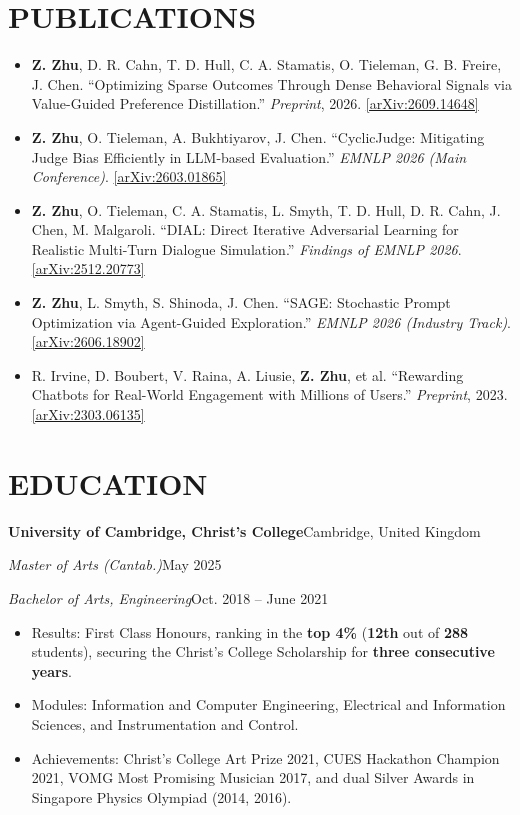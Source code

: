 \documentclass[10pt,a4paper]{article}
\newcommand{\headerinfo}[2]{%
    \textit{#1}\hfill #2\par\vspace{-0.5\baselineskip}%
}
\newcommand{\experience}[4]{%
    \textbf{#1}\hfill #2\par\vspace{-0.5\baselineskip}%
    \textit{#3}\hfill #4\par\vspace{-0.5\baselineskip}%
}
\begin{document}
\section{PUBLICATIONS}
\begin{itemize}
    \item \textbf{Z. Zhu}, D. R. Cahn, T. D. Hull, C. A. Stamatis, O. Tieleman, G. B. Freire, J. Chen. ``Optimizing Sparse Outcomes Through Dense Behavioral Signals via Value-Guided Preference Distillation.'' \textit{Preprint}, 2026. \href{https://arxiv.org/abs/2609.14648}{[arXiv:2609.14648]}
    \item \textbf{Z. Zhu}, O. Tieleman, A. Bukhtiyarov, J. Chen. ``CyclicJudge: Mitigating Judge Bias Efficiently in LLM-based Evaluation.'' \textit{EMNLP 2026 (Main Conference)}. \href{https://arxiv.org/abs/2603.01865}{[arXiv:2603.01865]}
    \item \textbf{Z. Zhu}, O. Tieleman, C. A. Stamatis, L. Smyth, T. D. Hull, D. R. Cahn, J. Chen, M. Malgaroli. ``DIAL: Direct Iterative Adversarial Learning for Realistic Multi-Turn Dialogue Simulation.'' \textit{Findings of EMNLP 2026}. \href{https://arxiv.org/abs/2512.20773}{[arXiv:2512.20773]}
    \item \textbf{Z. Zhu}, L. Smyth, S. Shinoda, J. Chen. ``SAGE: Stochastic Prompt Optimization via Agent-Guided Exploration.'' \textit{EMNLP 2026 (Industry Track)}. \href{https://arxiv.org/abs/2606.18902}{[arXiv:2606.18902]}
    \item R. Irvine, D. Boubert, V. Raina, A. Liusie, \textbf{Z. Zhu}, et al. ``Rewarding Chatbots for Real-World Engagement with Millions of Users.'' \textit{Preprint}, 2023. \href{https://arxiv.org/abs/2303.06135}{[arXiv:2303.06135]}
\end{itemize}

\section{EDUCATION}
\experience{University of Cambridge, Christ's College}{Cambridge, United Kingdom}
{Master of Arts (Cantab.)}{May 2025}
\headerinfo{Bachelor of Arts, Engineering}{Oct. 2018 -- June 2021}
\begin{itemize}
    \item Results: First Class Honours, ranking in the \textbf{top 4\%} (\textbf{12th} out of \textbf{288} students), securing the Christ's College Scholarship for \textbf{three consecutive years}.
    \item Modules: Information and Computer Engineering, Electrical and Information Sciences, and Instrumentation and Control.
    \item Achievements: Christ's College Art Prize 2021, CUES Hackathon Champion 2021, VOMG Most Promising Musician 2017, and dual Silver Awards in Singapore Physics Olympiad (2014, 2016).
\end{itemize}
\end{document}
